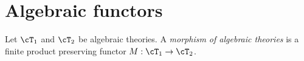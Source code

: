 \documentclass{zett}
\begin{document}
\section{Algebraic functors}
\label{sec:algebraic-functors}

\begin{defn}
  Let $\cT_{1}$ and $\cT_{2}$ be algebraic theories.
  A \emph{morphism of algebraic theories} is a finite product preserving functor $M : \cT_{1} \to \cT_{2}$.
\end{defn}



\end{document}
